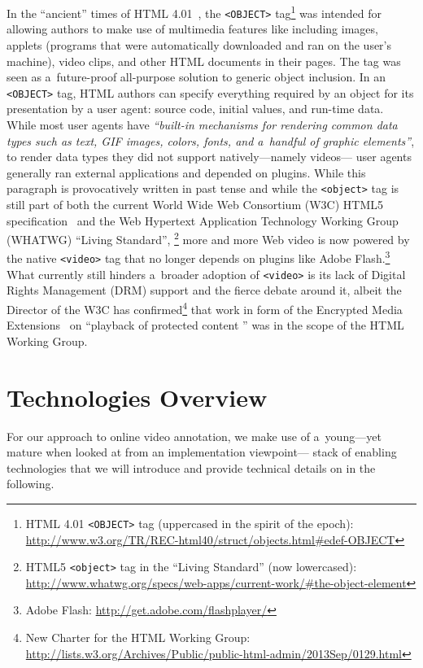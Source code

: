 \documentclass{sig-alternate}
\newcommand{\inlinelistingsize}{\fontsize{8pt}{11pt}}
\let\oldurl\url
\renewcommand{\url}[1]{\inlinelistingsize\oldurl{#1}}
\begin{document}
In the ``ancient'' times of HTML 4.01~\cite{raggett1999html401},
the \texttt{<OBJECT>} tag\footnote{HTML 4.01 \texttt{<OBJECT>} tag
(uppercased in the spirit of the epoch):
\url{http://www.w3.org/TR/REC-html40/struct/objects.html\#edef-OBJECT}}
was intended for allowing authors to make use of multimedia features
like including images, applets (programs that were automatically downloaded
and ran on the user's machine), video clips, and other HTML documents in their pages.
The tag was seen as a~future-proof all-purpose solution to generic object inclusion.
In an \texttt{<OBJECT>} tag, HTML authors can specify everything required
by an object for its presentation by a user agent:
source code, initial values, and run-time data.
While most user agents have \textit{``built-in mechanisms
for rendering common data types such as text, GIF images,
colors, fonts, and a~handful of graphic elements''},
to render data types they did not support natively---namely videos---%
user agents generally ran external applications and depended on plugins.
While this paragraph is provocatively written in past tense
and while the \texttt{<object>} tag is still part of both the current
World Wide Web Consortium (W3C) HTML5 specification~\cite{berjon2013html5}
and the Web Hypertext Application Technology Working Group
(WHATWG) ``Living Standard'',%
\footnote{HTML5 \texttt{<object>} tag in the ``Living Standard'' (now lowercased):
\url{http://www.whatwg.org/specs/web-apps/current-work/\#the-object-element}} 
more and more Web video is now powered by the native \texttt{<video>} tag
that no longer depends on plugins like Adobe Flash.\footnote{Adobe Flash:
\url{http://get.adobe.com/flashplayer/}}
What currently still hinders a~broader adoption of \texttt{<video>}
is its lack of Digital Rights Management (DRM) support
and the fierce debate around it, albeit the Director of the W3C
has confirmed\footnote{New Charter for the HTML Working Group:
\url{http://lists.w3.org/Archives/Public/public-html-admin/2013Sep/0129.html}}
that work in form of the Encrypted Media Extensions~\cite{dorwin2013eme}
on ``playback of protected content '' was in the scope of the HTML Working Group.

\section{Technologies Overview}

For our approach to online video annotation,
we make use of a~young---yet mature
when looked at from an implementation viewpoint---%
stack of enabling technologies that we will introduce
and provide technical details on in the following.
\end{document}
